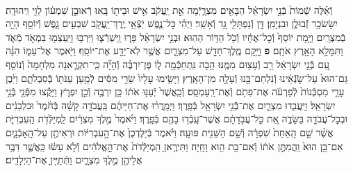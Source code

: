 \documentclass[twoside, openany, parskip=half, 11pt]{book}
\begin{document}
\begin{footnotesize}
\begin{multicols}{2}
\\
וְֿאֵ֗לֶּה שְֿׁמוֹת֙ בְּֿנֵ֣י יִשְׂרָאֵ֔ל הַבָּאִ֖ים מִצְרָ֑יְֿמָה אֵ֣ת יַֽעֲקֹ֔ב אִ֥ישׁ וּבֵית֖וֹ בָּֽאוּ׃ רְֿאוּבֵ֣ן שִׁמְע֔וֹן לֵוִ֖י וִֽיהוּדָֽה׃ יִשָּׂשׂכָ֥ר זְֿבוּלֻ֖ן וּבִנְיָמִֽן׃ דָּ֥ן וְֿנַפְתָּלִ֖י גָּ֥ד וְֿאָשֵֽׁר׃ וַיְהִ֗י כׇּל־נֶ֛פֶשׁ יֹֽצְֿאֵ֥י יֶֽרֶךְ־יַֽעֲקֹ֖ב שִׁבְעִ֣ים נָ֑פֶשׁ וְֿיוֹסֵ֖ף הָיָ֥ה בְֿמִצְרָֽיִם׃ וַיָּ֤מָת יוֹסֵף֙ וְֿכׇל־אֶחָ֔יו וְֿכֹ֖ל הַדּ֥וֹר הַהֽוּא׃ וּבְנֵ֣י יִשְׂרָאֵ֗ל פָּר֧וּ וַֽיִּשְׁרְֿצ֛וּ וַיִּרְבּ֥וּ וַיַּֽעַצְמ֖וּ בִּמְאֹ֣ד מְֿאֹ֑ד וַתִּמָּלֵ֥א הָאָ֖רֶץ אֹתָֽם׃ \textbf{פ}
וַיָּ֥קָם מֶֽלֶךְ־חָדָ֖שׁ עַל־מִצְרָ֑יִם אֲשֶׁ֥ר לֹֽא־יָדַ֖ע אֶת־יוֹסֵֽף׃ וַיֹּ֖אמֶר אֶל־עַמּ֑וֹ הִנֵּ֗ה עַ֚ם בְּֿנֵ֣י יִשְׂרָאֵ֔ל רַ֥ב וְֿעָצ֖וּם מִמֶּֽנּוּ׃ הָ֥בָה נִּֽתְחַכְּֿמָ֖ה ל֑וֹ פֶּן־יִרְבֶּ֗ה וְֿהָיָ֞ה כִּֽי־תִקְרֶ֤אנָה מִלְחָמָה֙ וְֿנוֹסַ֤ף גַּם־הוּא֙ עַל־שֹׂ֣נְֿאֵ֔ינוּ וְֿנִלְחַם־בָּ֖נוּ וְֿעָלָ֥ה מִן־הָאָֽרֶץ׃ וַיָּשִׂ֤ימוּ עָלָיו֙ שָׂרֵ֣י מִסִּ֔ים לְֿמַ֥עַן עַנֹּת֖וֹ בְּֿסִבְלֹתָ֑ם וַיִּ֜בֶן עָרֵ֤י מִסְכְּֿנוֹת֙ לְֿפַרְעֹ֔ה אֶת־פִּתֹ֖ם וְֿאֶת־רַֽעַמְסֵֽס׃ וְֿכַֽאֲשֶׁר֙ יְֿעַנּ֣וּ אֹת֔וֹ כֵּ֥ן יִרְבֶּ֖ה וְֿכֵ֣ן יִפְרֹ֑ץ וַיָּקֻ֕צוּ מִפְּֿנֵ֖י בְּֿנֵ֥י יִשְׂרָאֵֽל׃  וַיַּֽעֲבִ֧דוּ מִצְרַ֛יִם אֶת־בְּֿֿנֵ֥י יִשְׂרָאֵ֖ל בְּֿפָֽרֶךְ׃ וַיְמָֽרֲר֨וּ אֶת־חַיֵּיהֶ֜ם בַּֽעֲבֹדָ֣ה קָשָׁ֗ה בְּֿחֹ֨מֶר֙ וּבִלְבֵנִ֔ים וּבְכׇל־עֲבֹדָ֖ה בַּשָּׂדֶ֑ה אֵ֚ת כׇּל־עֲבֹ֣דָתָ֔ם אֲשֶׁר־עָֽבְֿד֥וּ בָהֶ֖ם בְּֿפָֽרֶךְ׃ וַיֹּ֨אמֶר֙ מֶ֣לֶךְ מִצְרַ֔יִם לַֽמְיַלְּֿדֹ֖ת הָֽעִבְרִיֹּ֑ת אֲשֶׁ֨ר שֵׁ֤ם הָֽאַחַת֙ שִׁפְרָ֔ה וְֿשֵׁ֥ם הַשֵּׁנִ֖ית פּוּעָֽה׃ וַיֹּ֗אמֶר בְּֿיַלֶּדְכֶן֙ אֶת־הָ֣עִבְרִיּ֔וֹת וּרְאִיתֶ֖ן עַל־הָֽאָבְֿנָ֑יִם אִם־בֵּ֥ן הוּא֙ וַֽהֲמִתֶּ֣ן אֹת֔וֹ וְֿאִם־בַּ֥ת הִ֖וא וָחָֽיָה׃ וַתִּירֶ֤אןָ הַֽמְיַלְּֿדֹת֙ אֶת־הָ֣אֱלֹהִ֔ים וְֿלֹ֣א עָשׂ֔וּ כַּֽאֲשֶׁ֛ר דִּבֶּ֥ר אֲלֵיהֶ֖ן מֶ֣לֶךְ מִצְרָ֑יִם וַתְּֿחַיֶּ֖יןָ אֶת־הַיְלָדִֽים׃


\end{multicols}
\end{footnotesize}
\end{document}
